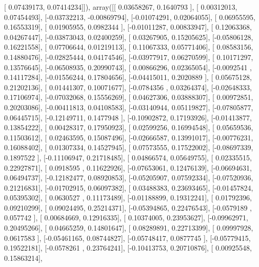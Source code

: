 \documentclass{article}
\begin{document}
       [ 0.07439173,  0.07414234]]), array([[ 0.03658267,  0.1640793 ],
       [ 0.00312013,  0.07454493],
       [-0.03732213, -0.00869794],
       [-0.01074291,  0.02064055],
       [ 0.06955595,  0.16553319],
       [ 0.01905955,  0.0982344 ],
       [-0.01011287,  0.00833947],
       [ 0.12063368,  0.04267447],
       [-0.03873043,  0.02400259],
       [ 0.03267905,  0.15205625],
       [-0.05806128,  0.16221558],
       [ 0.07706644,  0.01219113],
       [ 0.11067333,  0.05771406],
       [ 0.08583156,  0.14880476],
       [-0.02825444,  0.04174546],
       [-0.03977917,  0.06270599],
       [ 0.10171297,  0.13576645],
       [-0.06508935,  0.20990743],
       [ 0.00866296,  0.02365054],
       [-0.0092541 ,  0.14117284],
       [-0.01556244,  0.17804656],
       [-0.04415011,  0.2020889 ],
       [ 0.05675128,  0.21202136],
       [ 0.01441307,  0.10071677],
       [-0.0784356 ,  0.03264374],
       [-0.02648333,  0.17106974],
       [-0.07032068,  0.15556269],
       [ 0.04627306,  0.03888307],
       [ 0.00972851,  0.20203086],
       [-0.00411813,  0.04108583],
       [-0.03140944,  0.05119827],
       [-0.07805877,  0.06445715],
       [-0.12149711,  0.1477948 ],
       [-0.10902872,  0.17193926],
       [-0.01413877,  0.13854222],
       [ 0.00428317,  0.17950923],
       [ 0.02599256,  0.16994548],
       [ 0.05659536,  0.11503612],
       [ 0.02463595,  0.15087496],
       [-0.02666587,  0.13991017],
       [-0.00776231,  0.16088402],
       [ 0.01307334,  0.14527945],
       [ 0.07573555,  0.17522002],
       [-0.08697339,  0.1897522 ],
       [-0.11106947,  0.21718485],
       [ 0.04866574,  0.05649755],
       [ 0.02335515,  0.22927871],
       [ 0.0918595 ,  0.11622926],
       [-0.07653061,  0.12476139],
       [-0.06694631,  0.06494737],
       [-0.12182477,  0.08920853],
       [-0.05205907,  0.07592334],
       [-0.07520936,  0.21216831],
       [-0.01702915,  0.06097382],
       [ 0.03488383,  0.23693465],
       [-0.01457824,  0.05395302],
       [ 0.0630527 ,  0.11173489],
       [-0.01188899,  0.19312241],
       [ 0.01792396,  0.09210299],
       [ 0.09024495,  0.25214371],
       [-0.05394865,  0.22476543],
       [-0.0579189 ,  0.057742  ],
       [ 0.00684669,  0.12916335],
       [ 0.10374005,  0.23953627],
       [-0.09962971,  0.20495266],
       [ 0.04665259,  0.14801647],
       [ 0.08289891,  0.22713399],
       [ 0.09997928,  0.0617583 ],
       [-0.05461165,  0.08744827],
       [-0.05748417,  0.0877745 ],
       [-0.05779415,  0.19522181],
       [-0.0578261 ,  0.23764241],
       [-0.10413753,  0.20710876],
       [ 0.00925548,  0.15863214],
\end{document}
